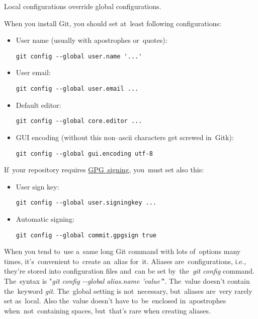 \warning Local configurations override global configurations.

When you install Git, you should set at~least following configurations:
\begin{itemize}
    \item User name (usually with apostrophes or~quotes):
        \begin{lstlisting}[frame=no, gobble=12]
            git config --global user.name '...'
        \end{lstlisting}
    \item User email:
        \begin{lstlisting}[frame=no, gobble=12]
            git config --global user.email ...
        \end{lstlisting}
    \item Default editor:
        \begin{lstlisting}[frame=no, gobble=12]
            git config --global core.editor ...
        \end{lstlisting}
    \item GUI encoding (without this non--ascii characters get screwed in~Gitk):
        \begin{lstlisting}[frame=no, gobble=12]
            git config --global gui.encoding utf-8
        \end{lstlisting}
\end{itemize}
\noindent If~your repository requires \hyperref[gitgpg]{GPG~signing}, you~must set also this:
\begin{itemize}
    \item User sign key:
        \begin{lstlisting}[frame=no, gobble=12]
            git config --global user.signingkey ...
        \end{lstlisting}
    \item Automatic signing:
        \begin{lstlisting}[frame=no, gobble=12]
            git config --global commit.gpgsign true
        \end{lstlisting}
\end{itemize}

When you tend to~use a~same long Git command with lots of~options many times, it's~convenient to~create an~alias for~it. Aliases are~configurations, i.e., they're stored into configuration files and~can be set by~the~\textit{git config} command. The~syntax is "\textit{git config -{}-global alias.name 'value'}". The~value doesn't contain the~keyword \textit{git}. The~global setting is not~necessary, but~aliases are~very rarely set as~local. Also the~value doesn't have to~be~enclosed in~apostrophes when~not~containing spaces, but~that's rare when creating aliases.
\newpage

